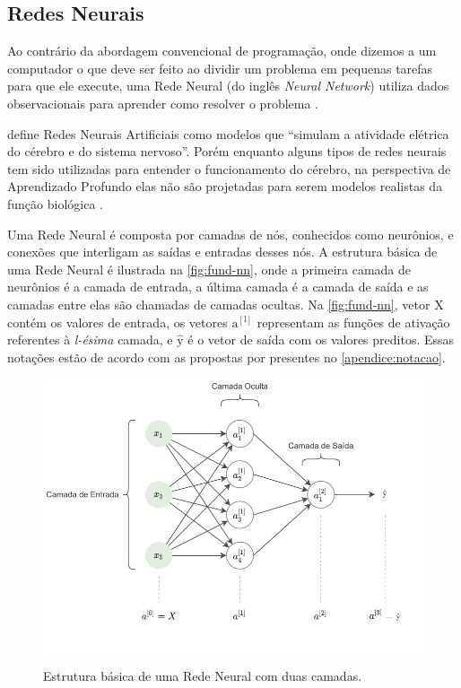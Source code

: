 \subsection{Redes Neurais} \label{cap:fund-ia-rn}
Ao contrário da abordagem convencional de programação, onde dizemos a um computador o que deve ser feito ao dividir um problema em pequenas tarefas para que ele execute, uma Rede Neural (do inglês \textit{Neural Network}) utiliza dados observacionais para aprender como resolver o problema \cite{ref:Nielsen}.

 define Redes Neurais Artificiais como modelos que ``simulam a atividade elétrica do cérebro e do sistema nervoso''. Porém enquanto alguns tipos de redes neurais tem sido utilizadas para entender o funcionamento do cérebro, na perspectiva de Aprendizado Profundo elas não são projetadas para serem modelos realistas da função biológica \cite{ref:Goodfellow-Bengio-Courville}.

Uma Rede Neural é composta por camadas de nós, conhecidos como neurônios, e conexões que interligam as saídas e entradas desses nós. A estrutura básica de uma Rede Neural é ilustrada na \autoref{fig:fund-nn}, onde a primeira camada de neurônios é a camada de entrada, a última camada é a camada de saída e as camadas entre elas são chamadas de camadas ocultas. Na \autoref{fig:fund-nn}, vetor $\mathrm{X}$ contém os valores de entrada, os vetores $\mathrm{a^{[l]}}$ representam as funções de ativação referentes à \textit{l-ésima} camada, e $\mathrm{\hat{y}}$ é o vetor de saída com os valores preditos. Essas notações estão de acordo com as propostas por  presentes no \autoref{apendice:notacao}.

\begin{figure}[h!] %
  \centering
  \caption{Estrutura básica de uma Rede Neural com duas camadas.}
  \includegraphics[scale=1.1]{img/img-fundamentacao-nn.pdf}
  \label{fig:fund-nn}
\end{figure}



